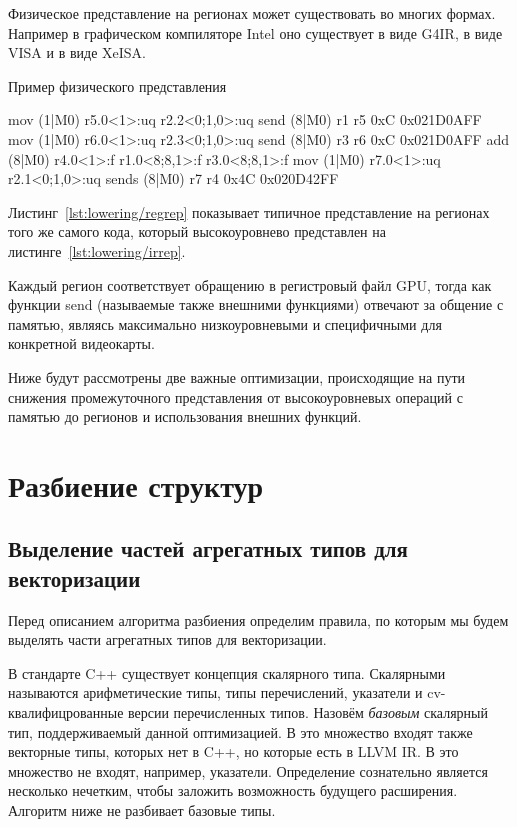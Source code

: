 Физическое представление на регионах может существовать во многих формах. Например в графическом компиляторе Intel оно существует в виде G4IR, в виде VISA и в виде XeISA. 

\begin{ListingEnv}[!h]
    \captiondelim{ } 
    \caption{Пример физического представления}\label{lst:lowering/regrep}
    \begin{Verb}
mov (1|M0) r5.0<1>:uq r2.2<0;1,0>:uq
send (8|M0) r1 r5 0xC 0x021D0AFF
mov (1|M0) r6.0<1>:uq r2.3<0;1,0>:uq
send (8|M0) r3 r6 0xC 0x021D0AFF
add (8|M0) r4.0<1>:f r1.0<8;8,1>:f r3.0<8;8,1>:f
mov (1|M0) r7.0<1>:uq r2.1<0;1,0>:uq
sends (8|M0) r7 r4 0x4C 0x020D42FF
    \end{Verb}
\end{ListingEnv}

Листинг~\cref{lst:lowering/regrep} показывает типичное представление на регионах того же самого кода, который высокоуровнево представлен на листинге~\cref{lst:lowering/irrep}.

Каждый регион соответствует обращению в регистровый файл GPU, тогда как функции send (называемые также внешними функциями) отвечают за общение с памятью, являясь максимально низкоуровневыми и специфичными для конкретной видеокарты.

Ниже будут рассмотрены две важные оптимизации, происходящие на пути снижения промежуточного представления от высокоуровневых операций с памятью до регионов и использования внешних функций.

\section{Разбиение структур}\label{sec:lowering/splitter}

\subsection{Выделение частей агрегатных типов для векторизации}\label{subsec:lowering/splitter/vectorization}

Перед описанием алгоритма разбиения определим правила, по которым мы будем выделять части агрегатных типов для векторизации.

В стандарте C++ существует концепция скалярного типа. Скалярными называются арифметические типы, типы перечислений, указатели и cv-квалифицрованные версии перечисленных типов. Назовём \emph{базовым} скалярный тип, поддерживаемый данной оптимизацией. В это множество входят также векторные типы, которых нет в C++, но которые есть в LLVM IR.  В это множество не входят, например, указатели. Определение сознательно является несколько нечетким, чтобы заложить возможность будущего расширения. Алгоритм ниже не разбивает базовые типы.

